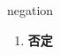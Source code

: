 
\begin{frame}
{\huge negation}
\begin{center}
\begin{enumerate}\Large
  \item \textbf{否定}
\end{enumerate}
\end{center}
\end{frame}
